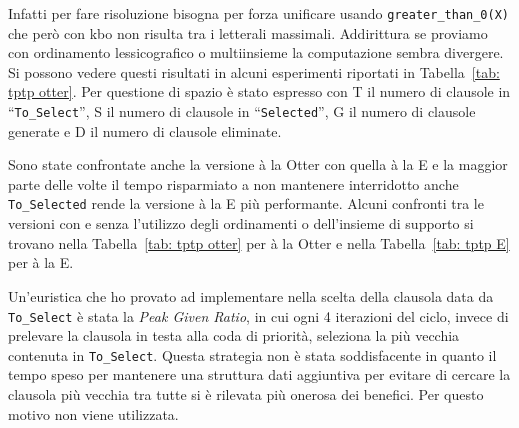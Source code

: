 \documentclass[a4paper,11pt]{article} %
\newcommand{\campo}{\texttt}
\newcommand{\cod}{\lstset{basicstyle=\ttfamily}\lstinline}
\begin{document}
%
%
%
Infatti per fare risoluzione bisogna per forza %
unificare %
usando
\cod{greater_than_0(X)} %
che però con kbo non risulta tra i letterali massimali.
Addirittura se proviamo con ordinamento lessicografico o multiinsieme 
la computazione sembra divergere.
Si possono vedere questi risultati in alcuni esperimenti riportati
in Tabella~\ref{tab: tptp otter}. Per questione di spazio
è stato espresso con \textsf{T} il numero di clausole in 
``\campo{To\_Select}'',
\textsf{S} il numero di clausole in ``\campo{Selected}'',
\textsf{G} il numero di clausole generate e
\textsf{D} il numero di clausole eliminate.

Sono state confrontate anche la versione à la Otter con quella à la E e
la maggior parte delle volte il tempo risparmiato a non mantenere 
interridotto anche \campo{To\_Selected}
rende la versione à la E più performante.
Alcuni confronti tra le versioni con e senza l'utilizzo degli ordinamenti
o dell'insieme di supporto
si trovano nella Tabella~\ref{tab: tptp otter} per à la Otter
e nella Tabella~\ref{tab: tptp E} per à la E.

Un'euristica che ho provato ad implementare nella scelta della clausola data
da \campo{To\_Select} è stata
la \emph{Peak Given Ratio}, in cui ogni 4 iterazioni del ciclo, invece di prelevare
la clausola in testa alla coda di priorità, seleziona la più vecchia contenuta 
in \campo{To\_Select}.
Questa strategia non è stata soddisfacente 
in quanto il tempo speso per mantenere una struttura dati
aggiuntiva per evitare di cercare la clausola più vecchia tra tutte
si è rilevata più onerosa dei benefici. Per questo motivo
non viene utilizzata.
\end{document}
